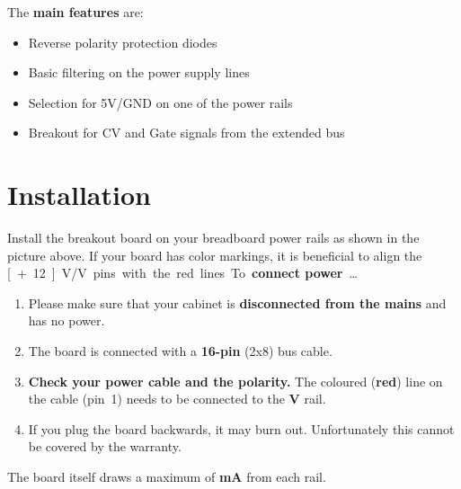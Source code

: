\documentclass[a4paper,
               11pt,
               parskip=half,
               headinclude,
               titlepage=false]{scrartcl}
\begin{document}
The \textbf{main features} are:
\begin{itemize}[noitemsep]
 \item Reverse polarity protection diodes
 \item Basic filtering on the power supply lines
 \item Selection for 5V/GND on one of the power rails
 \item Breakout for CV and Gate signals from the extended bus
\end{itemize}


\section*{Installation}

Install the breakout board on your breadboard power rails as shown in the picture above.
If your board has color markings,
it is beneficial to align the \unit[+12]V/\unit[-12]V pins with the red lines.

To \textbf{connect power} …
\begin{enumerate}[noitemsep]
 \item Please make sure that your cabinet is \textbf{disconnected from the mains} and has no power.
 \item The board is connected with a \textbf{16-pin} (2x8) bus cable.
 \item \textbf{Check your power cable and the polarity.} The coloured (\textbf{\color{red}red}) line on the cable (pin~1) needs to be connected to the \textbf{\unit[-12]{V}} rail.
 \item If you plug the board backwards, it may burn out.
 Unfortunately this cannot be covered by the warranty.
\end{enumerate}

The board itself draws a maximum of \textbf{\unit[2]mA} from each rail.
\end{document}
